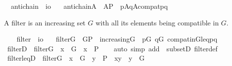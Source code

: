 \begin{isabellebody}
\isanewline
{}\isamarkupfalse%
\isanewline
\ \ antichain\ {\isacharcolon}{\kern0pt}{\isacharcolon}{\kern0pt}\ {\isachardoublequoteopen}i{\isasymRightarrow}o{\isachardoublequoteclose}\ \isanewline
\ \ {\isachardoublequoteopen}antichain{\isacharparenleft}{\kern0pt}A{\isacharparenright}{\kern0pt}\ {\isasymequiv}\ A{\isasymsubseteq}P\ {\isasymand}\ {\isacharparenleft}{\kern0pt}{\isasymforall}p{\isasymin}A{\isachardot}{\kern0pt}{\isasymforall}q{\isasymin}A{\isachardot}{\kern0pt}{\isacharparenleft}{\kern0pt}{\isasymnot}compat{\isacharparenleft}{\kern0pt}p{\isacharcomma}{\kern0pt}q{\isacharparenright}{\kern0pt}{\isacharparenright}{\kern0pt}{\isacharparenright}{\kern0pt}{\isachardoublequoteclose}%
\begin{isamarkuptext}%
A filter is an increasing set $G$ with all its elements 
being compatible in $G$.%
\end{isamarkuptext}\isamarkuptrue%
\isamarkupfalse%
\ \isanewline
\ \ filter\ {\isacharcolon}{\kern0pt}{\isacharcolon}{\kern0pt}\ {\isachardoublequoteopen}i{\isasymRightarrow}o{\isachardoublequoteclose}\ \isanewline
\ \ {\isachardoublequoteopen}filter{\isacharparenleft}{\kern0pt}G{\isacharparenright}{\kern0pt}\ {\isasymequiv}\ G{\isasymsubseteq}P\ {\isasymand}\ increasing{\isacharparenleft}{\kern0pt}G{\isacharparenright}{\kern0pt}\ {\isasymand}\ {\isacharparenleft}{\kern0pt}{\isasymforall}p{\isasymin}G{\isachardot}{\kern0pt}\ {\isasymforall}q{\isasymin}G{\isachardot}{\kern0pt}\ compat{\isacharunderscore}{\kern0pt}in{\isacharparenleft}{\kern0pt}G{\isacharcomma}{\kern0pt}leq{\isacharcomma}{\kern0pt}p{\isacharcomma}{\kern0pt}q{\isacharparenright}{\kern0pt}{\isacharparenright}{\kern0pt}{\isachardoublequoteclose}\isanewline
\isanewline
{}\isamarkupfalse%
\ filterD\ {\isacharcolon}{\kern0pt}\ {\isachardoublequoteopen}filter{\isacharparenleft}{\kern0pt}G{\isacharparenright}{\kern0pt}\ {\isasymLongrightarrow}\ x\ {\isasymin}\ G\ {\isasymLongrightarrow}\ x\ {\isasymin}\ P{\isachardoublequoteclose}\isanewline
%
\isadelimproof
\ \ %
\endisadelimproof
%
\isatagproof
{}\isamarkupfalse%
\ {\isacharparenleft}{\kern0pt}auto\ simp\ add\ {\isacharcolon}{\kern0pt}\ subsetD\ filter{\isacharunderscore}{\kern0pt}def{\isacharparenright}{\kern0pt}%
\endisatagproof
{\isafoldproof}%
%
\isadelimproof
\isanewline
%
\endisadelimproof
\isanewline
{}\isamarkupfalse%
\ filter{\isacharunderscore}{\kern0pt}leqD\ {\isacharcolon}{\kern0pt}\ {\isachardoublequoteopen}filter{\isacharparenleft}{\kern0pt}G{\isacharparenright}{\kern0pt}\ {\isasymLongrightarrow}\ x\ {\isasymin}\ G\ {\isasymLongrightarrow}\ y\ {\isasymin}\ P\ {\isasymLongrightarrow}\ x{\isasympreceq}y\ {\isasymLongrightarrow}\ y\ {\isasymin}\ G{\isachardoublequoteclose}\isanewline

\end{isabellebody}
